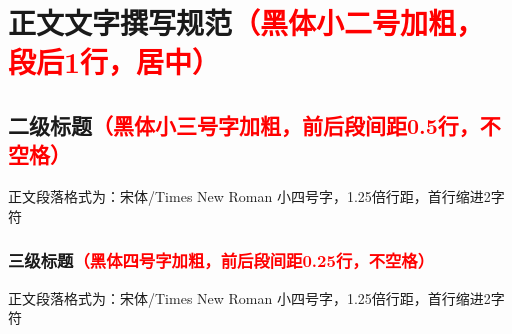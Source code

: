 \chapter[正文文字撰写规范]{正文文字撰写规范{\song\xiaosi \textcolor{red}{（黑体小二号加粗，段后1行，居中）}}}
\label{cha:intro}

\section[二级标题]{二级标题{\song\xiaosi \textcolor{red}{（黑体小三号字加粗，前后段间距0.5行，不空格）}}}
正文段落格式为：宋体/Times New Roman 小四号字，1.25倍行距，首行缩进2字符

\subsection[三级标题]{三级标题{\song\xiaosi \textcolor{red}{（黑体四号字加粗，前后段间距0.25行，不空格）}}}
正文段落格式为：宋体/Times New Roman 小四号字，1.25倍行距，首行缩进2字符
